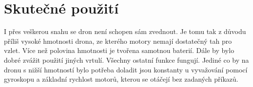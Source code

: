 \section{Skutečné použití}
     I přes veškerou snahu se dron není schopen sám zvednout. Je tomu tak z důvodu příliš vysoké hmotnosti drona, ze kterého motory nemají dostatečný tah pro vzlet. Více než polovina hmotnosti je tvořena samotnou baterií. Dále by bylo dobré zvážit použití jiných vrtulí. Všechny ostatní funkce fungují. Jediné co by na dronu s nižší hmotností bylo potřeba doladit jsou konstanty u vyvažování pomocí gyroskopu a základní rychlost motorů, kterou se otáčejí bez zadaných příkazů.